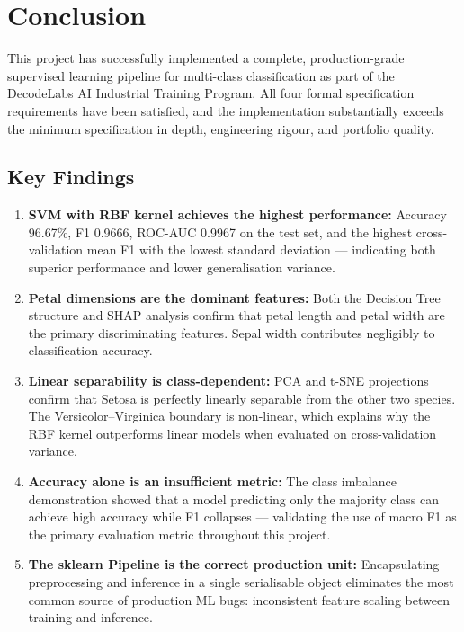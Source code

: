 \documentclass[12pt, a4paper]{report}
\begin{document}
\chapter{Conclusion}

This project has successfully implemented a complete, production-grade supervised
learning pipeline for multi-class classification as part of the DecodeLabs AI
Industrial Training Program. All four formal specification requirements have been
satisfied, and the implementation substantially exceeds the minimum specification in
depth, engineering rigour, and portfolio quality.

\section{Key Findings}

\begin{enumerate}[itemsep=6pt]

  \item \textbf{SVM with RBF kernel achieves the highest performance:}
        Accuracy 96.67\%, F1 0.9666, ROC-AUC 0.9967 on the test set, and the highest
        cross-validation mean F1 with the lowest standard deviation — indicating both
        superior performance and lower generalisation variance.

  \item \textbf{Petal dimensions are the dominant features:}
        Both the Decision Tree structure and SHAP analysis confirm that petal length and
        petal width are the primary discriminating features. Sepal width contributes
        negligibly to classification accuracy.

  \item \textbf{Linear separability is class-dependent:}
        PCA and t-SNE projections confirm that Setosa is perfectly linearly separable
        from the other two species. The Versicolor--Virginica boundary is non-linear,
        which explains why the RBF kernel outperforms linear models when evaluated on
        cross-validation variance.

  \item \textbf{Accuracy alone is an insufficient metric:}
        The class imbalance demonstration showed that a model predicting only the
        majority class can achieve high accuracy while F1 collapses — validating the
        use of macro F1 as the primary evaluation metric throughout this project.

  \item \textbf{The sklearn Pipeline is the correct production unit:}
        Encapsulating preprocessing and inference in a single serialisable object
        eliminates the most common source of production ML bugs: inconsistent feature
        scaling between training and inference.

\end{enumerate}
\end{document}
